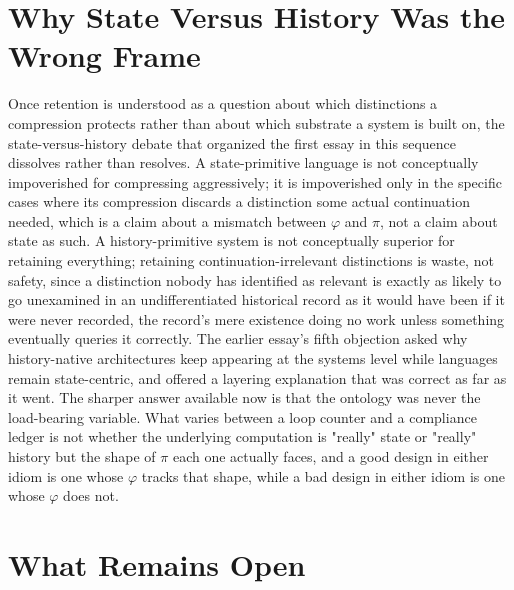 \documentclass[11pt]{article}
\begin{document}
\section{Why State Versus History Was the Wrong Frame}

Once retention is understood as a question about which distinctions a compression protects rather than about which substrate a system is built on, the state-versus-history debate that organized the first essay in this sequence dissolves rather than resolves. A state-primitive language is not conceptually impoverished for compressing aggressively; it is impoverished only in the specific cases where its compression discards a distinction some actual continuation needed, which is a claim about a mismatch between $\varphi$ and $\pi$, not a claim about state as such. A history-primitive system is not conceptually superior for retaining everything; retaining continuation-irrelevant distinctions is waste, not safety, since a distinction nobody has identified as relevant is exactly as likely to go unexamined in an undifferentiated historical record as it would have been if it were never recorded, the record's mere existence doing no work unless something eventually queries it correctly. The earlier essay's fifth objection asked why history-native architectures keep appearing at the systems level while languages remain state-centric, and offered a layering explanation that was correct as far as it went. The sharper answer available now is that the ontology was never the load-bearing variable. What varies between a loop counter and a compliance ledger is not whether the underlying computation is "really" state or "really" history but the shape of $\pi$ each one actually faces, and a good design in either idiom is one whose $\varphi$ tracks that shape, while a bad design in either idiom is one whose $\varphi$ does not.

\section{What Remains Open}
\end{document}
